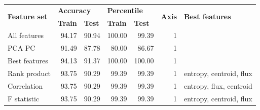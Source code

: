 \begin{table}[h]
\begin{adjustbox}{width=\textwidth}
\begin{tabular}{|l|rr|rr|r|l|}
\hline
\multirow{2}{*}{\textbf{Feature set}} & \multicolumn{2}{l|}{\textbf{Accuracy}}                                   & \multicolumn{2}{l|}{\textbf{Percentile}}                                 & \multicolumn{1}{l|}{\multirow{2}{*}{\textbf{Axis}}} & \multirow{2}{*}{\textbf{Best features}} \\ \cline{2-5}
                                      & \multicolumn{1}{l|}{\textbf{Train}} & \multicolumn{1}{l|}{\textbf{Test}} & \multicolumn{1}{l|}{\textbf{Train}} & \multicolumn{1}{l|}{\textbf{Test}} & \multicolumn{1}{l|}{}                               &                                         \\ \hline
All features                          & \multicolumn{1}{r|}{94.17}          & 90.94                              & \multicolumn{1}{r|}{100.00}         & 99.39                              & 1                                                   &                                         \\ \hline
PCA PC                                & \multicolumn{1}{r|}{91.49}          & 87.78                              & \multicolumn{1}{r|}{80.00}          & 86.67                              & 1                                                   &                                         \\ \hline
Best features                         & \multicolumn{1}{r|}{94.13}          & 91.37                              & \multicolumn{1}{r|}{100.00}         & 100.00                             & 1                                                   &                                         \\ \hline
Rank product                          & \multicolumn{1}{r|}{93.75}          & 90.29                              & \multicolumn{1}{r|}{99.39}          & 99.39                              & 1                                                   & entropy, centroid, flux                 \\ \hline
Correlation                           & \multicolumn{1}{r|}{93.75}          & 90.29                              & \multicolumn{1}{r|}{99.39}          & 99.39                              & 1                                                   & entropy, flux, centroid                 \\ \hline
F statistic                           & \multicolumn{1}{r|}{93.75}          & 90.29                              & \multicolumn{1}{r|}{99.39}          & 99.39                              & 1                                                   & entropy, centroid, flux                 \\ \hline

\end{tabular}
\end{adjustbox}
\end{table}
